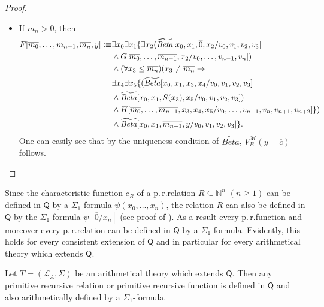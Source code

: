 \begin{proof}
\begin{itemize}
\item If $m_n > 0$, then 
\begin{align*}
F[\overline{m_0}, \ldots, m_{n-1},\overline{m_n},y] \vcentcolon \equiv &\exists x_0 \exists x_1 \lbrace \exists x_2  (\mathit{\widetilde{Beta}}[x_0,x_1,\overline{0},x_2/v_0,v_1,v_2,v_3] \\
&\wedge G[\overline{m_0}, \ldots, \overline{m_{n-1}},x_2/v_0, \ldots, v_{n-1},v_{n}] ) \\
&\wedge ( \forall x_3 \le \overline{m_n} )  ( x_3 \neq \overline{m_n} \rightarrow \\
& \exists x_4 \exists x_5  \lbrace ( \mathit{\widetilde{Beta}}[x_0,x_1,x_3,x_4/v_0,v_1,v_2,v_3] \\
& \wedge \mathit{\widetilde{Beta}}[x_0,x_1,S(x_3),x_5/v_0,v_1,v_2,v_3]) \\
& \wedge H[\overline{m_0}, \ldots, \overline{m_{n-1}}, x_3, x_4, x_5 /v_0, \ldots, v_{n-1}, v_{n}, v_{n+1}, v_{n+2}] \rbrace ) \\
& \wedge \mathit{\widetilde{Beta}}[x_0,x_1,\overline{m_{n-1}},y/v_0,v_1,v_2,v_3]\rbrace. 
\end{align*}
One can easily see that by the uniqueness condition of $\mathit{\widetilde{Beta}}$, $V_B^\mathcal{M}(y= \overline{c})$ follows.
\end{itemize} 
\end{proof}

Since the characteristic function $c_R$ of a p.\,r.\@ relation $R \subseteq \mathbb{N}^n$ $(n\ge 1)$ can be defined in $\mathsf{Q}$ by a $\Sigma_1$-formula $\psi(x_0, \ldots, x_n)$, the relation $R$ can also be defined in $\mathsf{Q}$ by the $\Sigma_1$-formula $\psi[\overline{0}/x_n]$ (see proof of ). As a result every p.\,r.\@ function and moreover every p.\,r.\@ relation can be defined in $\mathsf{Q}$ by a $\Sigma_1$-formula. Evidently, this holds for every consistent extension of $\mathsf{Q}$ and in particular for every arithmetical theory which extends $\mathsf{Q}$. 

\begin{cor}\label{cor:captureandexpress}
Let $T= (\mathcal{L}_A, \Sigma)$ be an arithmetical theory which extends $\mathsf{Q}$. Then any primitive recursive relation or primitive recursive function is defined in $\mathsf{Q}$ and also arithmetically defined by a $\Sigma_1$-formula. 
\end{cor}

